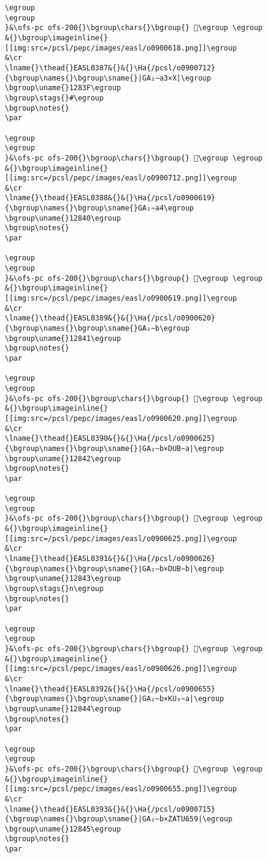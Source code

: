 \begin{verbatim}
\egroup
\egroup
}&\ofs-pc ofs-200{}\bgroup\chars{}\bgroup{} 𒠾\egroup \egroup
&{}\bgroup\imageinline{}[[img:src=/pcsl/pepc/images/easl/o0900618.png]]\egroup
&\cr
\lname{}\thead{}EASL0387&{}&{}\Ha{/pcsl/o0900712}{\bgroup\names{}\bgroup\sname{}|GA₂∼a3×X|\egroup
\bgroup\uname{}1283F\egroup
\bgroup\stags{}#\egroup
\bgroup\notes{}
\par 

\egroup
\egroup
}&\ofs-pc ofs-200{}\bgroup\chars{}\bgroup{} 𒠿\egroup \egroup
&{}\bgroup\imageinline{}[[img:src=/pcsl/pepc/images/easl/o0900712.png]]\egroup
&\cr
\lname{}\thead{}EASL0388&{}&{}\Ha{/pcsl/o0900619}{\bgroup\names{}\bgroup\sname{}GA₂∼a4\egroup
\bgroup\uname{}12840\egroup
\bgroup\notes{}
\par 

\egroup
\egroup
}&\ofs-pc ofs-200{}\bgroup\chars{}\bgroup{} 𒡀\egroup \egroup
&{}\bgroup\imageinline{}[[img:src=/pcsl/pepc/images/easl/o0900619.png]]\egroup
&\cr
\lname{}\thead{}EASL0389&{}&{}\Ha{/pcsl/o0900620}{\bgroup\names{}\bgroup\sname{}GA₂∼b\egroup
\bgroup\uname{}12841\egroup
\bgroup\notes{}
\par 

\egroup
\egroup
}&\ofs-pc ofs-200{}\bgroup\chars{}\bgroup{} 𒡁\egroup \egroup
&{}\bgroup\imageinline{}[[img:src=/pcsl/pepc/images/easl/o0900620.png]]\egroup
&\cr
\lname{}\thead{}EASL0390&{}&{}\Ha{/pcsl/o0900625}{\bgroup\names{}\bgroup\sname{}|GA₂∼b×DUB∼a|\egroup
\bgroup\uname{}12842\egroup
\bgroup\notes{}
\par 

\egroup
\egroup
}&\ofs-pc ofs-200{}\bgroup\chars{}\bgroup{} 𒡂\egroup \egroup
&{}\bgroup\imageinline{}[[img:src=/pcsl/pepc/images/easl/o0900625.png]]\egroup
&\cr
\lname{}\thead{}EASL0391&{}&{}\Ha{/pcsl/o0900626}{\bgroup\names{}\bgroup\sname{}|GA₂∼b×DUB∼b|\egroup
\bgroup\uname{}12843\egroup
\bgroup\stags{}n\egroup
\bgroup\notes{}
\par 

\egroup
\egroup
}&\ofs-pc ofs-200{}\bgroup\chars{}\bgroup{} 𒡃\egroup \egroup
&{}\bgroup\imageinline{}[[img:src=/pcsl/pepc/images/easl/o0900626.png]]\egroup
&\cr
\lname{}\thead{}EASL0392&{}&{}\Ha{/pcsl/o0900655}{\bgroup\names{}\bgroup\sname{}|GA₂∼b×KU₃∼a|\egroup
\bgroup\uname{}12844\egroup
\bgroup\notes{}
\par 

\egroup
\egroup
}&\ofs-pc ofs-200{}\bgroup\chars{}\bgroup{} 𒡄\egroup \egroup
&{}\bgroup\imageinline{}[[img:src=/pcsl/pepc/images/easl/o0900655.png]]\egroup
&\cr
\lname{}\thead{}EASL0393&{}&{}\Ha{/pcsl/o0900715}{\bgroup\names{}\bgroup\sname{}|GA₂∼b×ZATU659|\egroup
\bgroup\uname{}12845\egroup
\bgroup\notes{}
\par 


\end{verbatim}

